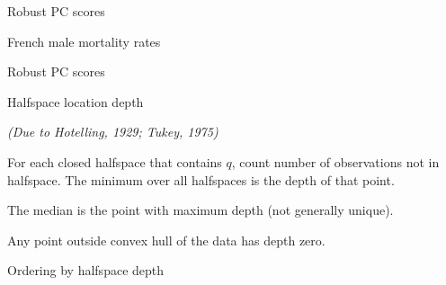\documentclass[14pt]{beamer}
\begin{document}
\begin{frame}{Robust PC scores}
 
\end{frame}



\begin{frame}{French male mortality rates}

\end{frame}


\begin{frame}{Robust PC scores}
 
\end{frame}

\begin{frame}{Halfspace location depth}




\textit{(Due to Hotelling, 1929; Tukey, 1975)}


\biz
\item For each closed halfspace that contains $q$, count number of observations not in halfspace. The minimum over all halfspaces is the depth of that point. 
\item The median is the point with maximum depth (not generally unique).
\item Any point outside convex hull of the data has depth zero.

\eiz


\end{frame}

\begin{frame}{Ordering by halfspace depth}

\end{frame}
\end{document}
